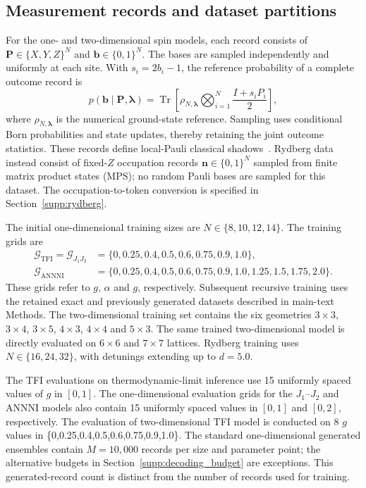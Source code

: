 \documentclass[11pt,a4paper]{article}
\newcommand{\subhead}[1]{\subsection*{#1}}
\begin{document}
\subhead{Measurement records and dataset partitions}
For the one- and two-dimensional spin models, each record consists of
$\mathbf{P}\in\{X,Y,Z\}^{N}$ and $\mathbf{b}\in\{0,1\}^{N}$. The bases are
sampled independently and uniformly at each site. With $s_i=2b_i-1$, the
reference probability of a complete outcome record is
\begin{equation}
p(\mathbf{b}\mid\mathbf{P},\boldsymbol{\lambda})
=\operatorname{Tr}\!\left[
\rho_{N,\boldsymbol{\lambda}}
\bigotimes_{i=1}^{N}\frac{I+s_iP_i}{2}\right],
\label{supp:eq:measurement_probability}
\end{equation}
where $\rho_{N,\boldsymbol{\lambda}}$ is the numerical ground-state reference.
Sampling uses conditional Born probabilities and state updates, thereby
retaining the joint outcome statistics. These records define local-Pauli
classical shadows~\cite{huang2020predicting}. Rydberg data instead consist of
fixed-$Z$ occupation records $\mathbf{n}\in\{0,1\}^{N}$ sampled from finite
matrix product states (MPS); no random Pauli bases are sampled for this dataset.
The occupation-to-token conversion is specified in Section~\ref{supp:rydberg}.

The initial one-dimensional training sizes are $N\in\{8,10,12,14\}$.
The training grids are
\begin{align}
\mathcal{G}_{\mathrm{TFI}}=\mathcal{G}_{J_1J_2}
 &=\{0,0.25,0.4,0.5,0.6,0.75,0.9,1.0\},\\
\mathcal{G}_{\mathrm{ANNNI}}
 &=\{0,0.25,0.4,0.5,0.6,0.75,0.9,1.0,1.25,1.5,1.75,2.0\}.
\end{align}
These grids refer to $g$, $\alpha$ and $g$, respectively.
Subsequent recursive training uses the retained
exact and previously generated datasets described in main-text Methods. The two-dimensional training set contains the six geometries
$3\times3$, $3\times4$, $3\times5$, $4\times3$, $4\times4$ and $5\times3$.
The same trained two-dimensional model is directly evaluated on $6\times6$
and $7\times7$ lattices. Rydberg training uses $N\in\{16,24,32\}$, with
detunings extending up to $d=5.0$.

The TFI evaluations on thermodynamic-limit inference use 15 uniformly spaced values of $g$ in $[0,1]$. The one-dimensional evaluation grids for the $J_1$--$J_2$ and ANNNI models also contain 15 uniformly spaced values in $[0,1]$
and $[0,2]$, respectively. The evaluation of two-dimensional TFI model is conducted on 8 $g$ values in \{0,0.25,0.4,0.5,0.6,0.75,0.9,1.0\}. The standard one-dimensional generated ensembles contain $M=10{,}000$ records per size and parameter point; the alternative budgets in Section~\ref{supp:decoding_budget} are exceptions. This generated-record count is distinct from the number of records used for training.
\end{document}
